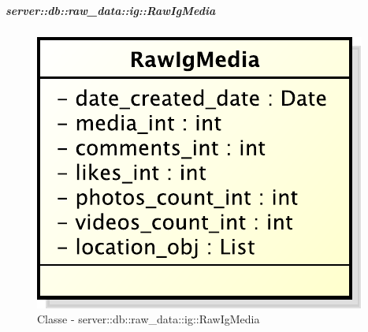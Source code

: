 		\subparagraph{server::db::raw\_data::ig::RawIgMedia} %
		\label{subp:server_db_raw_data_ig_rawigmedia}
			\begin{figure}[htbp]
				\centering
				\centerline{\includegraphics[scale=0.75]{./images/server/classes/db/raw_ig_media.pdf}}
				\caption{Classe - server::db::raw\_data::ig::RawIgMedia}
			\end{figure}
